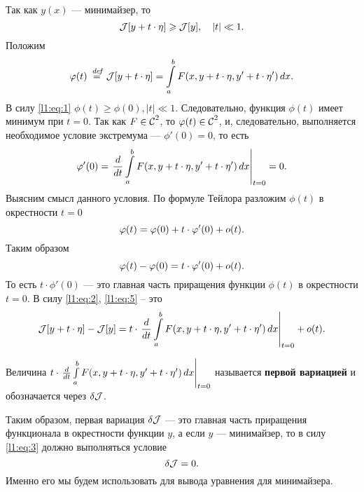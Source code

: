Так как $y(x)$ --- минимайзер, то 
\begin{equation}
	\label{l1:eq:1}
	\hfill\J[y+t\cdot\eta]\geqslant\J[y],\quad |t|\ll1.\hfill
\end{equation}
Положим 
\begin{equation}
	\label{l1:eq:2}
	\hfill\phi(t)\eqdef\J[y+t\cdot\eta]=\int\limits_a^b F(x,y+t\cdot\eta,y'+t\cdot\eta')\,\dd{x}.\hfill
\end{equation}
В силу \eqref{l1:eq:1} $\phi(t)\geqslant\phi(0), |t|\ll1$. Следовательно, функция $\phi(t)$ имеет минимум при $t=0$. Так как $F\in\Cfn[]{2}$, то $\phi(t)\in\Cfn[]{2}$, и, следовательно, выполняется необходимое условие экстремума --- $\phi'(0)=0$, то есть
\begin{equation}
	\label{l1:eq:3}
	\hfill\phi'(0)=\left.\der{}{t}\int\limits_a^b F(x,y+t\cdot\eta,y'+t\cdot\eta')\,\dd{x}\right|_{t=0}=0.\hfill
\end{equation}
Выясним смысл данного условия. По формуле Тейлора разложим $\phi(t)$ в окрестности $t=0$
\begin{equation}
	\label{l1:eq:4}
	\hfill\phi(t)=\phi(0)+t\cdot\phi'(0)+o(t).\hfill
\end{equation}
Таким образом
\begin{equation}
	\label{l1:eq:5}
	\hfill\phi(t)-\phi(0)=t\cdot\phi'(0)+o(t).\hfill
\end{equation}
То есть $t\cdot\phi'(0)$ --- это главная часть приращения функции $\phi(t)$ в окрестности $t=0$. В силу \eqref{l1:eq:2}, \eqref{l1:eq:5} -- это 
\begin{equation}
	\label{l1:eq:6}
	\hfill\J[y+t\cdot\eta]-\J[y]=t\cdot\left.\der{}{t}\int\limits_a^b F(x,y+t\cdot\eta,y'+t\cdot\eta')\,\dd{x}\right|_{t=0}+o(t).\hfill
\end{equation}
\begin{_def}
	Величина $t\cdot\left.\der{}{t}\int\limits_a^b F(x,y+t\cdot\eta,y'+t\cdot\eta')\,\dd{x}\right|_{t=0}$ называется \textbf{первой вариацией} и обозначается через $\delta\J$.
\end{_def}

Таким образом, первая вариация $\delta\J$ --- это главная часть приращения функционала в окрестности функции $y$, а если $y$ --- минимайзер, то в силу \eqref{l1:eq:3} должно выполняться условие
\begin{equation}
	\label{l1:eq:7}
	\hfill\delta\J=0.\hfill
\end{equation}
Именно его мы будем использовать для вывода уравнения для минимайзера.


